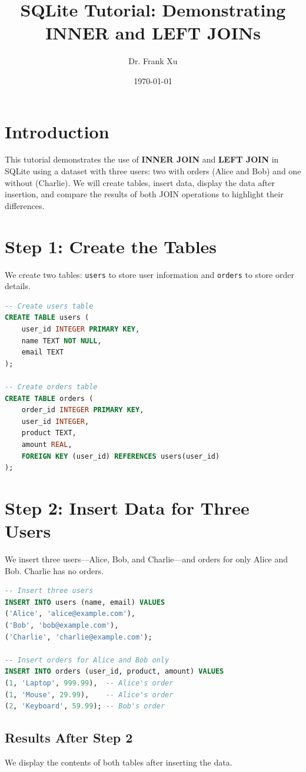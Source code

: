 \documentclass{article}
\title{SQLite Tutorial: Demonstrating INNER and LEFT JOINs}
\author{Dr. Frank Xu}
\date{\today}
\begin{document}
\maketitle

\section*{Introduction}
This tutorial demonstrates the use of \textbf{INNER JOIN} and \textbf{LEFT JOIN} in SQLite using a dataset with three users: two with orders (Alice and Bob) and one without (Charlie). We will create tables, insert data, display the data after insertion, and compare the results of both JOIN operations to highlight their differences.

\section*{Step 1: Create the Tables}
We create two tables: \texttt{users} to store user information and \texttt{orders} to store order details.

\begin{lstlisting}[language=SQL]
-- Create users table
CREATE TABLE users (
    user_id INTEGER PRIMARY KEY,
    name TEXT NOT NULL,
    email TEXT
);

-- Create orders table
CREATE TABLE orders (
    order_id INTEGER PRIMARY KEY,
    user_id INTEGER,
    product TEXT,
    amount REAL,
    FOREIGN KEY (user_id) REFERENCES users(user_id)
);
\end{lstlisting}

\section*{Step 2: Insert Data for Three Users}
We insert three users---Alice, Bob, and Charlie---and orders for only Alice and Bob. Charlie has no orders.

\begin{lstlisting}[language=SQL]
-- Insert three users
INSERT INTO users (name, email) VALUES 
('Alice', 'alice@example.com'),
('Bob', 'bob@example.com'),
('Charlie', 'charlie@example.com');

-- Insert orders for Alice and Bob only
INSERT INTO orders (user_id, product, amount) VALUES 
(1, 'Laptop', 999.99),  -- Alice's order
(1, 'Mouse', 29.99),    -- Alice's order
(2, 'Keyboard', 59.99); -- Bob's order
\end{lstlisting}

\subsection{Results After Step 2}
We display the contents of both tables after inserting the data.
\end{document}
